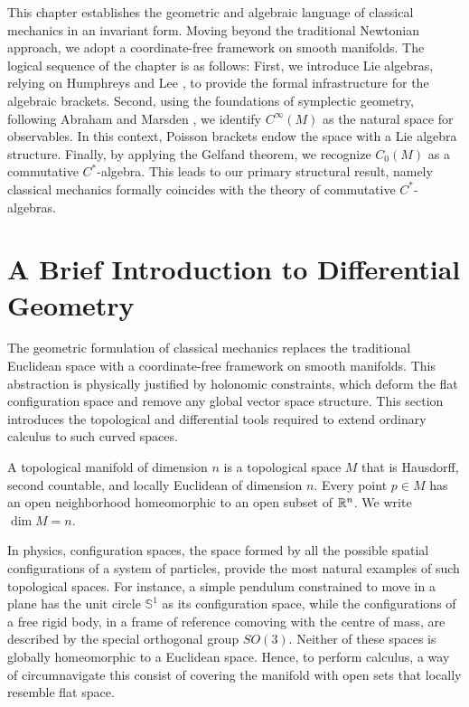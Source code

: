 
\noindent This chapter establishes the geometric and algebraic language of classical mechanics in an invariant form. Moving beyond the traditional Newtonian approach, we adopt a coordinate-free framework on smooth manifolds. The logical sequence of the chapter is as follows: First, we introduce Lie algebras, relying on Humphreys \cite{humphreysIntroductionLieAlgebras2010} and Lee \cite{leeIntroductionSmoothManifolds2013}, to provide the formal infrastructure for the algebraic brackets. Second, using the foundations of symplectic geometry, following Abraham and Marsden \cite{abrahamFoundationsMechanics2008}, we identify $C^\infty(M)$ as the natural space for observables. In this context, Poisson brackets endow the space with a Lie algebra structure. Finally, by applying the Gelfand theorem, we recognize $C_0(M)$ as a commutative $C^*$-algebra. This leads to our primary structural result, namely classical mechanics formally coincides with the theory of commutative $C^*$-algebras.

\section{A Brief Introduction to Differential Geometry}

The geometric formulation of classical mechanics replaces the traditional Euclidean space with a coordinate-free framework on smooth manifolds. This abstraction is physically justified by holonomic constraints, which deform the flat configuration space and remove any global vector space structure. This section introduces the topological and differential tools required to extend ordinary calculus to such curved spaces.

\begin{definition}\label{def:top-man}
	A topological manifold of dimension $n$ is a topological space $M$ that is Hausdorff, second countable, and locally Euclidean of dimension $n$. Every point $p \in M$ has an open neighborhood homeomorphic to an open subset of $\mathbb{R}^n$. We write $\dim M = n$.
\end{definition}

In physics, configuration spaces, the space formed by all the possible spatial configurations of a system of particles, provide the most natural examples of such topological spaces. For instance, a simple pendulum constrained to move in a plane has the unit circle $\mathbb{S}^1$ as its configuration space, while the configurations of a free rigid body, in a frame of reference comoving with the centre of mass, are described by the special orthogonal group $SO(3)$. Neither of these spaces is globally homeomorphic to a Euclidean space. Hence, to perform calculus, a way of circumnavigate this consist of covering the manifold with open sets that locally resemble flat space.

